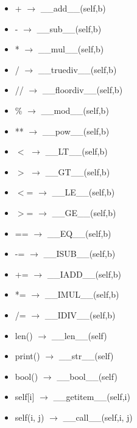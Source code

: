 \documentclass{article}
\begin{document}
\begin{multicols}{2}
\begin{itemize}
\item + $\rightarrow$ \_\_add\_\_(self,b)
\item - $\rightarrow$ \_\_sub\_\_(self,b)
\item * $\rightarrow$ \_\_mul\_\_(self,b)
\item / $\rightarrow$ \_\_truediv\_\_(self,b)
\item // $\rightarrow$ \_\_floordiv\_\_(self,b)
\item \% $\rightarrow$ \_\_mod\_\_(self,b)
\item ** $\rightarrow$ \_\_pow\_\_(self,b)
\item $<$ $\rightarrow$ \_\_LT\_\_(self,b)
\item $>$ $\rightarrow$ \_\_GT\_\_(self,b)
\item $<$= $\rightarrow$ \_\_LE\_\_(self,b)
\item $>$= $\rightarrow$ \_\_GE\_\_(self,b)
\columnbreak
\item == $\rightarrow$ \_\_EQ\_\_(self,b)
\item -= $\rightarrow$ \_\_ISUB\_\_(self,b)
\item += $\rightarrow$ \_\_IADD\_\_(self,b)
\item *= $\rightarrow$ \_\_IMUL\_\_(self,b)
\item /= $\rightarrow$ \_\_IDIV\_\_(self,b)\\
\item len() $\rightarrow$ \_\_len\_\_(self)
\item print() $\rightarrow$ \_\_str\_\_(self)
\item bool() $\rightarrow$ \_\_bool\_\_(self)
\item self[i] $\rightarrow$ \_\_getitem\_\_(self,i)
\item self(i, j) $\rightarrow$ \_\_call\_\_(self,i, j)

\end{itemize}
\end{multicols}
\newpage
\end{document}
